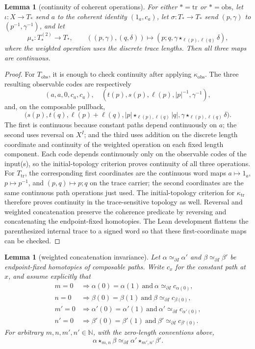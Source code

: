 \documentclass[10pt,reqno]{amsart}
\theoremstyle{definition}
\theoremstyle{plain}
\newtheorem{lemma}[definition]{Lemma}
\theoremstyle{remark}
\newcommand{\N}{\mathbb N}
\begin{document}
\begin{lemma}[continuity of coherent operations]\label{lem:coherent-operations-continuous}
For either $*=\mathrm{tr}$ or $*=\mathrm{obs}$, let $\iota:X\to T_*$ send
$a$ to the coherent identity $(1_a,c_a)$, let $\sigma:T_*\to T_*$ send
$(p,\gamma)$ to
$(p^{-1},\gamma^{-1})$, and let
\[
  \mu_*:T_*^{(2)}\longrightarrow T_*,
  \qquad ((p,\gamma),(q,\delta))\longmapsto
    (p;q,\gamma\star_{\ell(p),\ell(q)}\delta),
\]
where the weighted operation uses the discrete trace lengths.  Then all three
maps are continuous.
\end{lemma}

\begin{proof}
For $T_{\mathrm{obs}}$, it is enough to check continuity after applying
$\kappa_{\mathrm{obs}}$.  The three resulting observable codes are respectively
\[
  (a,a,0,c_a,c_a),
\quad
  (t(p),s(p),\ell(p),|p|^{-1},\gamma^{-1}),
\]
and, on the composable pullback,
\[
  \bigl(s(p),t(q),\ell(p)+\ell(q),
    |p|\star_{\ell(p),\ell(q)}|q|,
    \gamma\star_{\ell(p),\ell(q)}\delta\bigr).
\]
The first is continuous because constant paths depend continuously on $a$;
the second uses reversal on $X^I$; and the third uses addition on the discrete
length coordinate and continuity of the weighted operation on each fixed
length component.  Each code depends continuously only on the observable
codes of the input(s), so the initial-topology criterion proves continuity of
all three operations.  For $T_{\mathrm{tr}}$, the corresponding first
coordinates are the continuous word maps
$a\mapsto 1_a$, $p\mapsto p^{-1}$, and $(p,q)\mapsto p;q$ on the trace
carrier; the second coordinates are the same continuous path operations just
used.  The initial-topology criterion for $\kappa_{\mathrm{tr}}$ therefore
proves continuity in the trace-sensitive topology as well.  Reversal and
weighted concatenation preserve the coherence predicate by reversing and
concatenating the endpoint-fixed homotopies.  The Lean development flattens
the parenthesized internal trace to a signed word so that these
first-coordinate maps can be checked.
\end{proof}

\begin{lemma}[weighted concatenation invariance]
\label{lem:weighted-concat-invariance}
Let $\alpha\simeq_{\partial I}\alpha'$ and
$\beta\simeq_{\partial I}\beta'$ be endpoint-fixed homotopies of composable
paths.  Write $c_x$ for the constant path at $x$, and assume explicitly that
\[
\begin{aligned}
m=0&\Rightarrow \alpha(0)=\alpha(1)\ \text{and}\ \alpha\simeq_{\partial I}c_{\alpha(0)},\\
n=0&\Rightarrow \beta(0)=\beta(1)\ \text{and}\ \beta\simeq_{\partial I}c_{\beta(0)},\\
m'=0&\Rightarrow \alpha'(0)=\alpha'(1)\ \text{and}\ \alpha'\simeq_{\partial I}c_{\alpha'(0)},\\
n'=0&\Rightarrow \beta'(0)=\beta'(1)\ \text{and}\ \beta'\simeq_{\partial I}c_{\beta'(0)}.
\end{aligned}
\]
For arbitrary
$m,n,m',n'\in\N$, with the zero-length conventions above,
\[
  \alpha\star_{m,n}\beta
  \simeq_{\partial I}
  \alpha'\star_{m',n'}\beta'.
\]
\end{lemma}
\end{document}
